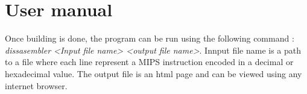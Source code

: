 \section{User manual}

Once building is done, the program can be run using the following command : \textit{dissasembler <Input file name> <output file name>}. Innput file name is a path to a file where each line represent a MIPS instruction encoded in a decimal or hexadecimal value. The output file is an html page and can be viewed using any internet browser. 
